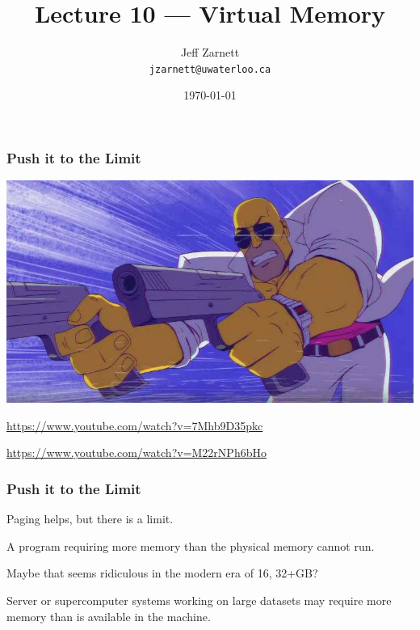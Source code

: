 

\title{Lecture 10 --- Virtual Memory}

\author{Jeff Zarnett \\ \small \texttt{jzarnett@uwaterloo.ca}}
\date{\today}




\begin{frame}
  \titlepage

 \end{frame}


\begin{frame}
\frametitle{Push it to the Limit}

\begin{center}
	\includegraphics[width=\textwidth]{images/limit.jpg}
\end{center}

\url{https://www.youtube.com/watch?v=7Mhb9D35pkc}

\url{https://www.youtube.com/watch?v=M22rNPh6bHo}

\end{frame}


\begin{frame}
\frametitle{Push it to the Limit}

Paging helps, but there is a limit. 

A program requiring more memory than the physical memory cannot run. 

Maybe that seems ridiculous in the modern era of 16, 32+GB?

Server or supercomputer systems working on large datasets may require more memory than is available in the machine.

\end{frame}

